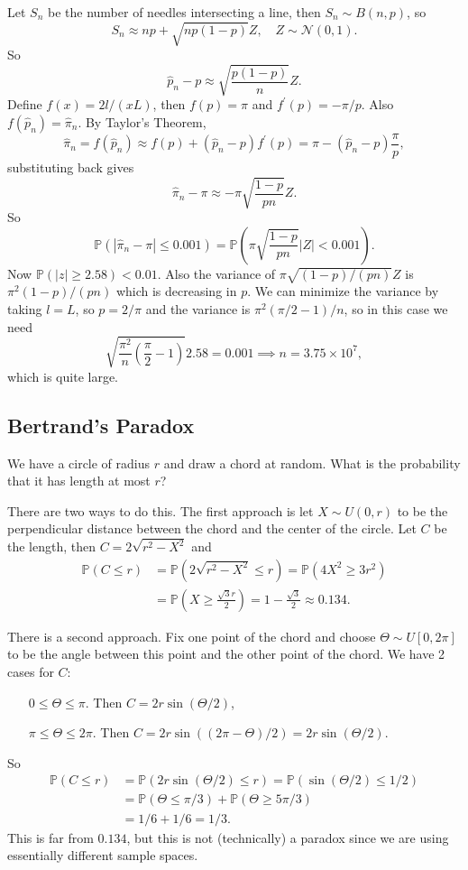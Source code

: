 Let $S_n$ be the number of needles intersecting a line, then $S_n\sim B(n,p)$, so 
\[
    S_n\approx np+\sqrt{np(1-p)}Z,\quad Z \sim \mathcal{N}(0,1).
\]
So
\[
    \hat{p}_n-p\approx \sqrt{\frac{p(1-p)}{n}}Z.
\]
Define $f(x)=2 l /(xL)$, then $f(p)=\pi$ and $f^\prime(p)=-\pi/p$. Also $f(\hat{p}_n)=\hat\pi_n$.
By Taylor's Theorem,
$$\hat\pi_n=f(\hat{p}_n)\approx f(p)+(\hat{p}_n-p)f^\prime(p)=\pi-(\hat{p}_n-p)\frac{\pi}{p},$$
substituting back gives
$$\hat\pi_n-\pi\approx-\pi\sqrt{\frac{1-p}{pn}}Z.$$
So
$$\mathbb P(|\hat\pi_n-\pi|\le 0.001)=\mathbb P\left( \pi\sqrt{\frac{1-p}{pn}}|Z|<0.001 \right).$$
Now $\mathbb P(|z|\ge 2.58)<0.01$.
Also the variance of $\pi\sqrt{(1-p)/(pn)}Z$ is $\pi^2(1-p)/(pn)$ which is decreasing in $p$.
We can minimize the variance by taking $ l =L$, so $p=2/\pi$ and the variance is $\pi^2(\pi/2-1)/n$, so in this case we need
$$\sqrt{\frac{\pi^2}{n}(\frac{\pi}{2}-1)}2.58=0.001\implies n=3.75\times 10^7,$$
which is quite large.

\subsection{Bertrand's Paradox}
We have a circle of radius $r$ and draw a chord at random.
What is the probability that it has length at most $r$?

There are two ways to do this.
The first approach is let $X\sim U(0,r)$ to be the perpendicular distance between the chord and the center of the circle.
Let $C$ be the length, then $ C = 2 \sqrt{r^2-X^2} $ and 
\begin{align*}
    \mathbb{P}(C\le r)&= \mathbb{P}(2 \sqrt{r^2-X^2}\le r)
    = \mathbb{P}(4X^2\ge 3r^2)\\ 
    &= \mathbb{P}\left( X\ge \frac{\sqrt{3}r}{2} \right)
    = 1-\frac{\sqrt{3}}{2}\approx 0.134.
\end{align*}

There is a second approach.
Fix one point of the chord and choose $\Theta\sim U[0,2\pi]$ to be the angle between this point and the other point of the chord. We have 2 cases for $C$:
\begin{itemize}[align=left]
    \item[$ 0\le \Theta\le \pi $.] Then $ C=2r \sin (\Theta/2) $,
    \item[$ \pi\le \Theta\le 2\pi $.] Then $ C=2r \sin ((2\pi-\Theta)/2)=2r \sin (\Theta/2) $.
\end{itemize}
So 
\begin{align*}
    \mathbb{P}(C\le r)&= \mathbb{P}(2r \sin (\Theta/2)\le r)=\mathbb{P}(\sin (\Theta/2)\le 1/2)\\ 
    &= \mathbb{P}(\Theta\le \pi/3) + \mathbb{P}(\Theta\ge 5\pi/3)\\ 
    &= 1/6+1/6=1/3.
\end{align*}
This is far from $ 0.134 $, but this is not (technically) a paradox since we are using essentially different sample spaces.